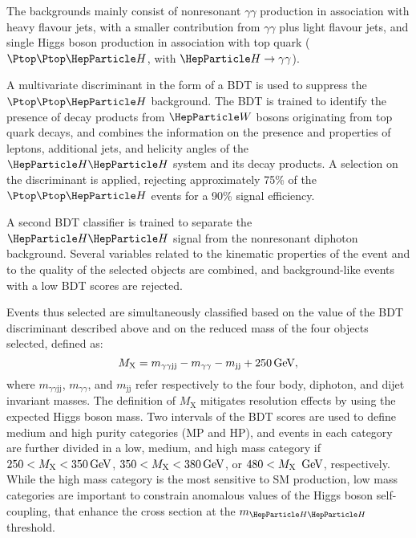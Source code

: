 The backgrounds mainly consist of nonresonant $\gamma\gamma$ production in association with heavy flavour jets, with a smaller contribution from $\gamma\gamma$ plus light flavour jets, and single Higgs boson production in association with top quark ($\Ptop\Ptop\PH$, with $\PH\to\gamma\gamma$).

A multivariate discriminant  in the form of a BDT is used to suppress the $\Ptop\Ptop\PH$ background.
The BDT is trained to identify the presence of decay products from $\PW$ bosons originating from top quark decays, and combines the information on the presence and properties of leptons, additional jets, and helicity angles of the $\HH$ system and its decay products.
A selection on the discriminant is applied, rejecting approximately 75\% of the $\Ptop\Ptop\PH$ events for a 90\% signal efficiency.

A second BDT classifier is trained to separate the $\HH$ signal from the nonresonant diphoton background.
Several variables related to the kinematic properties of the event and to the quality of the selected objects are combined, and background-like events with a low BDT scores are rejected.

Events thus selected are simultaneously classified based on the value of the BDT discriminant described above and on the reduced mass of the four objects selected, defined as:
\begin{equation}
    M_\text{X} = m_{\gamma\gamma\text{jj}} - m_{\gamma\gamma} - m_\text{jj} + 250\,\text{Ge\hspace{-.08em}V},
\end{equation}
where $m_{\gamma\gamma\text{jj}}$, $m_{\gamma\gamma}$, and $m_\text{jj}$ refer respectively to the four body, diphoton, and dijet invariant masses.
The definition of $M_\text{X}$ mitigates resolution effects by using the expected Higgs boson mass.
Two intervals of the BDT scores are used to define medium and high purity categories (MP and HP), and events in each category are further divided in a low, medium, and high mass category if $250 < M_\text{X} < 350\,\text{Ge\hspace{-.08em}V}$, $350 < M_\text{X} < 380\,\text{Ge\hspace{-.08em}V}$, or $480 < M_\text{X}~\,\text{Ge\hspace{-.08em}V}$, respectively.
While the high mass category is the most sensitive to SM \HH production, low mass categories are important to constrain anomalous values of the Higgs boson self-coupling, that enhance the cross section at the $m_{\HH}$ threshold.

